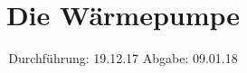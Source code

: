 

\subject{V206}
\title{Die Wärmepumpe}
\date{%
  Durchführung: 19.12.17
  \hspace{3em}
  Abgabe: 09.01.18
}



\maketitle
\thispagestyle{empty}
\tableofcontents
\newpage







\printbibliography{}


